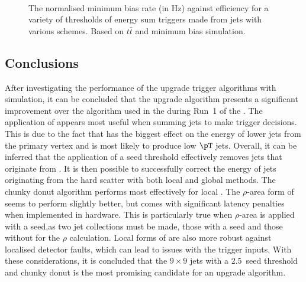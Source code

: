 \begin{figure}
  \centering
  ~
  \caption{ The normalised minimum bias rate (in Hz) against efficiency for a
  variety of thresholds of energy sum
  triggers made from jets with various \PUS schemes. Based on
  $t\bar{t}$ and minimum bias \MC simulation.}
  \label{fig:rateEffJet}
\end{figure}

\subsection{Conclusions}

After investigating the performance of the upgrade trigger algorithms
with simulation, it can be concluded that the upgrade algorithm
presents a significant improvement over the algorithm used in the \GCT
during Run~1 of the \LHC. The application of \PUS appears most useful
when summing jets to make trigger decisions. This is due to the fact
that \PU has the biggest effect on the energy of lower \pT jets from
the primary vertex and is most likely to produce low $\pT$ jets.
Overall, it can be inferred that the application of a seed threshold
effectively removes jets that originate from \PU. It is then possible
to successfully correct the energy of jets originating from the hard
scatter with both local and global \PUS methods. The chunky donut
algorithm performs most effectively for local \PUS. The $\rho$-area
form of \PUS seems to perform slightly better, but comes with
significant latency penalties when implemented in hardware. This is
particularly true when $\rho$-area \PUS is applied with a seed,as two
jet collections must be made, those with a seed and those without for
the $\rho$ calculation. Local forms of \PUS are also more robust
against localised detector faults, which can lead to issues with the
trigger inputs. With these considerations, it is concluded that the
$9\times9$ \TT jets with a 2.5~\gev seed threshold and chunky donut
\PUS is the most promising candidate for an upgrade algorithm. 

